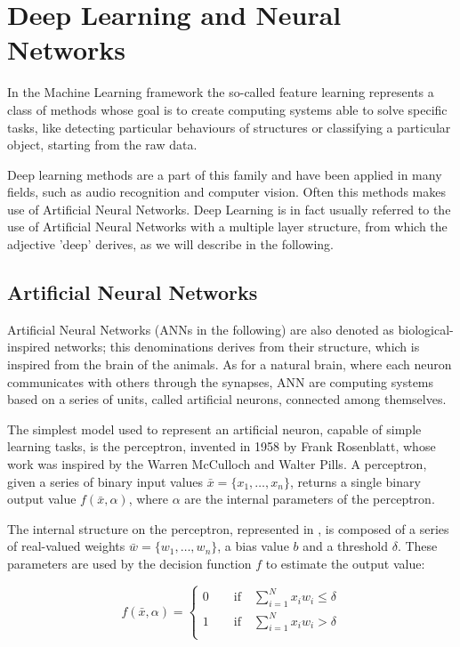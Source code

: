 \chapter{Deep Learning and Neural Networks}

In the Machine Learning framework the so-called feature learning represents a class of methods whose goal is to create computing systems able to solve specific tasks, like detecting particular behaviours of structures or classifying a particular object, starting from the raw data.

Deep learning methods are a part of this family and have been applied in many fields, such as audio recognition and computer vision. Often this methods makes use of Artificial Neural Networks. Deep Learning is in fact usually referred to the use of Artificial Neural Networks with a multiple layer structure, from which the adjective 'deep' derives, as we will describe in the following.

\section{Artificial Neural Networks}

Artificial Neural Networks (ANNs in the following) are also denoted as biological-inspired networks; this denominations derives from their structure, which is inspired from  the brain of the animals. As for a natural brain, where each neuron communicates with others through the synapses, ANN are computing systems based on a series of units, called artificial neurons, connected among themselves. 

The simplest model used to represent an artificial neuron, capable of simple learning tasks, is the perceptron, invented in 1958 by Frank Rosenblatt\cite{perceptron}, whose work was inspired by the Warren McCulloch and Walter Pills\cite{nielsen}. A perceptron, given a series of binary input values $\bar{x}=\{x_1,\dots, x_n\}$, returns a single binary output value $f(\bar{x}, \alpha)$, where $\alpha$ are the internal parameters of the perceptron. 

The internal structure on the perceptron, represented in , is composed of a series of real-valued weights $\bar{w}=\{w_1,\dots,w_n\}$, a bias value $b$ and a threshold $\delta$. These parameters are used by the decision function $f$ to estimate the output value:

\begin{equation}
f(\bar{x},\alpha) = 
\begin{cases}
0\qquad\text{if}\quad\sum_{i=1}^N x_iw_i \leq \delta \\
1\qquad\text{if}\quad\sum_{i=1}^N x_iw_i > \delta \\
\end{cases}
\end{equation}

